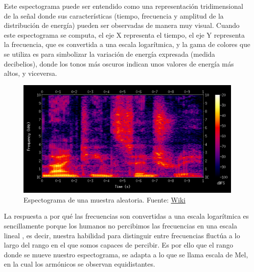 \documentclass[11pt,a4paper,spanish]{book}
\begin{document}
	
	Este espectograma puede ser entendido como una representación tridimensional de la señal donde sus características (tiempo, frecuencia y amplitud de la distribución de energía) pueden ser observadas de manera muy visual. Cuando este espectograma se computa, el eje X representa el tiempo, el eje Y representa la frecuencia, que es convertida a una escala logarítmica, y la gama de colores que se utiliza es para simbolizar la variación de energía expresada (medida decibelios), donde los tonos más oscuros indican unos valores de energía más altos, y viceversa.
	
	\begin{figure}[h]
		\centering
		\includegraphics[scale=0.4]{spectogram.png} 
		\caption{Espectograma de una muestra aleatoria. Fuente: \href{https://es.other.wiki/wiki/Spectrogram}{Wiki}}
	\end{figure}
	
	La respuesta a por qué las frecuencias son convertidas a una escala logarítmica es sencillamente porque los humanos no percibimos las frecuencias en una escala lineal \cite{Varshney}, es decir, nuestra habilidad para distinguir entre frecuencias fluctúa a lo largo del rango en el que somos capaces de percibir\cite{StevensVolkmann}. Es por ello que el rango donde se mueve nuestro espectograma, se adapta a lo que se llama escala de Mel, en la cual los armónicos se observan equidistantes.



	
	
		



	
	

	
	
	\printbibliography
	
\end{document}
